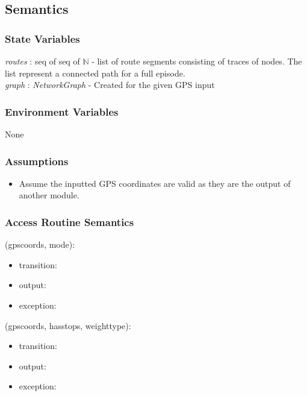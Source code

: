 \documentclass[12pt, titlepage]{article}
\begin{document}
\subsection{Semantics}

\subsubsection{State Variables}

\emph{routes} : seq of seq of $\mathbb{N}$ - list of route segments consisting of traces of nodes. The list represent a connected path for a full episode. \\
\emph{graph} : \emph{NetworkGraph} - Created for the given GPS input

\subsubsection{Environment Variables}

None

\subsubsection{Assumptions}

\begin{itemize}
    \item Assume the inputted GPS coordinates are valid as they are the output of another module.
\end{itemize}

\subsubsection{Access Routine Semantics}

\noindent {}(gpscoords, mode):
\begin{itemize}
\item transition: 
\item output:  
\item exception:  
\end{itemize}

\noindent {}(gpscoords, hasstops, weighttype):
\begin{itemize}
\item transition:  
\item output:  
\item exception:  
\end{itemize}
\end{document}
